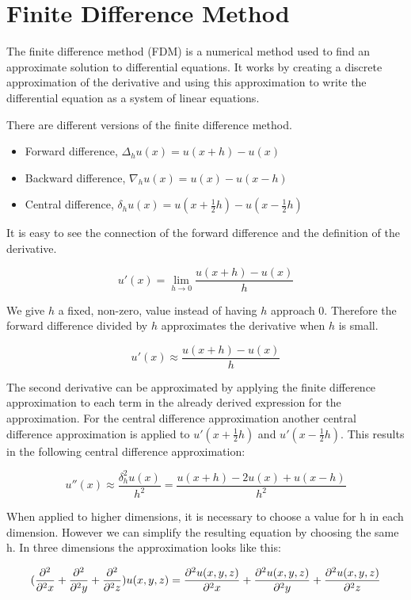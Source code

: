 \section{Finite Difference Method}

The finite difference method (FDM) is a numerical method used to find an approximate 
solution to differential equations. It works by creating a discrete approximation 
of the derivative and using this approximation to write the differential equation 
as a system of linear equations.

There are different versions of the finite difference method.
\begin{itemize}
	\item Forward difference, $\Delta_hu(x) = u(x+h) - u(x)$
	\item Backward difference, $\nabla_hu(x) = u(x) - u(x - h)$
	\item Central difference, $\delta_hu(x) = u(x + \frac{1}{2}h) - u(x - \frac{1}{2}h)$
\end{itemize}

It is easy to see the connection of the forward difference and the definition of 
the derivative.

$$u'(x) = \lim_{h \to 0} \frac{u(x+h) - u(x)}{h}$$

We give $h$ a fixed, non-zero, value instead of having $h$ approach 0. Therefore 
the forward difference divided by $h$ approximates the derivative when $h$ is small.

$$u'(x) \approx \frac{u(x+h) - u(x)}{h}$$

The second derivative can be approximated by applying the finite difference 
approximation to each term in the already derived expression for the approximation. 
For the central difference approximation another central difference approximation 
is applied to $u'(x + \frac{1}{2}h)$ and $u'(x - \frac{1}{2}h)$. This results in 
the following central difference approximation:

$$u''(x) \approx \frac{\delta_h^2u(x)}{h^2} = \frac{u(x+h) - 2u(x) + u(x-h)}{h^2}$$

When applied to higher dimensions, it is necessary to choose a value for h in 
each dimension. However we can simplify the resulting equation by choosing the same h. 
In three dimensions the approximation looks like this:

$$(\frac{\partial^2}{\partial^2 x} + \frac{\partial^2}{\partial^2 y} + \frac{\partial^2}{\partial^2 z}) u(x, y, z) = \frac{\partial^2 u(x, y, z)}{\partial^2 x} 
+ \frac{\partial^2 u(x, y, z)}{\partial^2 y} + \frac{\partial^2 u(x, y, z)}{\partial^2 z}$$

